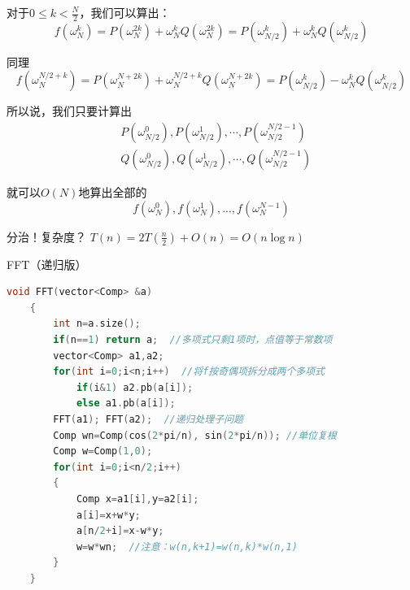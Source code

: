 \documentclass{beamer}
\begin{document}
\begin{frame}
    对于$0\leq k <\frac{N}{2}$，我们可以算出：
    \begin{equation*}
        f(\omega_N^k)=P(\omega_N^{2k})+\omega_N^{k} Q(\omega_N^{2k})=P(\omega_{N/2}^{k})+\omega_N^{k} Q(\omega_{N/2}^{k})
    \end{equation*}
    
    同理
    \begin{equation*}
        f(\omega_N^{N/2+k})=P(\omega_N^{N+2k})+\omega_N^{N/2+k} Q(\omega_N^{N+2k})=P(\omega_{N/2}^{k})-\omega_N^{k} Q(\omega_{N/2}^{k})
    \end{equation*}

    \pause
    所以说，我们只要计算出
    \begin{align*}
        &P(\omega_{N/2}^0),P(\omega_{N/2}^1),\cdots , P(\omega_{N/2}^{N/2-1})\\
        &Q(\omega_{N/2}^0),Q(\omega_{N/2}^1),\cdots , Q(\omega_{N/2}^{N/2-1})
    \end{align*}

    就可以$O(N)$地算出全部的
    \begin{equation*}
        f(\omega_N^0),f(\omega_N^1),...,f(\omega_N^{N-1})
    \end{equation*}

    \pause
    分治！复杂度？
    \pause
    $T(n)=2T\left(\frac{n}{2}\right)+O(n)=O(n\log n)$
\end{frame}

\begin{frame}[fragile]{FFT（递归版）}
    \begin{lstlisting}[language=c++]
    void FFT(vector<Comp> &a)
    {
        int n=a.size();
        if(n==1) return a;  //多项式只剩1项时，点值等于常数项
        vector<Comp> a1,a2;
        for(int i=0;i<n;i++)  //将f按奇偶项拆分成两个多项式
            if(i&1) a2.pb(a[i]);
            else a1.pb(a[i]);
        FFT(a1); FFT(a2);  //递归处理子问题
        Comp wn=Comp(cos(2*pi/n), sin(2*pi/n)); //单位复根
        Comp w=Comp(1,0);
        for(int i=0;i<n/2;i++)
        {
            Comp x=a1[i],y=a2[i];
            a[i]=x+w*y;
            a[n/2+i]=x-w*y;
            w=w*wn;  //注意：w(n,k+1)=w(n,k)*w(n,1)
        }
    }
    \end{lstlisting}
\end{frame}
\end{document}
